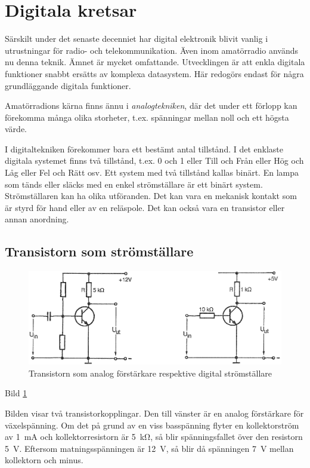 \section{Digitala kretsar}
\label{digitala kretsar}

Särskilt under det senaste decenniet har digital elektronik blivit vanlig i
utrustningar för radio- och telekommunikation. Även inom amatörradio används nu
denna teknik. Ämnet är mycket omfattande. Utvecklingen är att enkla digitala
funktioner snabbt ersätts av komplexa datasystem. Här redogörs endast för några
grundläggande digitala funktioner.

Amatörradions kärna finns ännu i \emph{analogtekniken}, där det under ett
förlopp kan förekomma många olika storheter, t.ex. spänningar mellan noll och
ett högsta värde.

I digitaltekniken förekommer bara ett bestämt antal tillstånd. I det enklaste
digitala systemet finns två tillstånd, t.ex. 0 och 1 eller Till och Från eller
Hög och Låg eller Fel och Rätt osv. Ett system med två tillstånd kallas
binärt. En lampa som tänds eller släcks med en enkel strömställare är ett binärt
system. Strömställaren kan ha olika utföranden. Det kan vara en mekanisk kontakt
som är styrd för hand eller av en reläspole. Det kan också vara en transistor
eller annan anordning.

\subsection{Transistorn som strömställare}

\begin{figure}
\includegraphics[width=\textwidth]{images/cropped_pdfs/bild_2_2-35.pdf}
\caption{Transistorn som analog förstärkare respektive digital strömställare}
\label{fig:BildII2-35}
\end{figure}

Bild \ref{fig:BildII2-35}

Bilden visar två transistorkopplingar. Den till vänster är en analog förstärkare
för växelspänning. Om det på grund av en viss basspänning flyter en
kollektorström av 1~mA och kollektorresistorn är 5~kΩ, så blir spänningsfallet
över den resistorn 5~V. Eftersom matningsspänningen är 12~V, så blir då
spänningen 7~V mellan kollektorn och minus.

